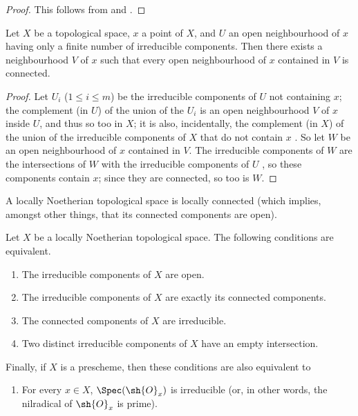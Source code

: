 \begin{proof}
This follows from  and .
\end{proof}

\begin{lemma}[6.1.8]
\label{I.6.1.8}
Let $X$ be a topological space, $x$ a point of $X$, and $U$ an open neighbourhood of $x$ having only a finite number of irreducible components.
Then there exists a neighbourhood $V$ of $x$ such that every open neighbourhood of $x$ contained in $V$ is connected.
\end{lemma}

\begin{proof}
Let $U_i$ ($1\leq i\leq m$) be the irreducible components of $U$ not containing $x$;
the complement (in $U$) of the union of the $U_i$ is an open neighbourhood $V$ of $x$ inside $U$, and thus so too in $X$;
it is also, incidentally, the complement (in $X$) of the union of the irreducible components of $X$ that do not contain $x$ .
So let $W$ be an open neighbourhood of $x$ contained in $V$.
The irreducible components of $W$ are the intersections of $W$ with the irreducible components of $U$ , so these components contain $x$;
since they are connected, so too is $W$.
\end{proof}

\begin{corollary}[6.1.9]
\label{I.6.1.9}
A locally Noetherian topological space is locally connected (which implies, amongst other things, that its connected components are open).
\end{corollary}

\begin{proposition}[6.1.10]
\label{I.6.1.10}
Let $X$ be a locally Noetherian topological space.
The following conditions are equivalent.
\begin{enumerate}
  \item[{\rm(a)}] The irreducible components of $X$ are open.
  \item[{\rm(b)}] The irreducible components of $X$ are exactly its connected components.
  \item[{\rm(c)}] The connected components of $X$ are irreducible.
  \item[{\rm(d)}] Two distinct irreducible components of $X$ have an empty intersection.
\end{enumerate}
Finally, if $X$ is a prescheme, then these conditions are also equivalent to
\begin{enumerate}
  \item[{\rm(e)}] For every $x\in X$, $\Spec(\sh{O}_x)$ is irreducible (or, in other words, the nilradical of $\sh{O}_x$ is prime).
\end{enumerate}
\end{proposition}

